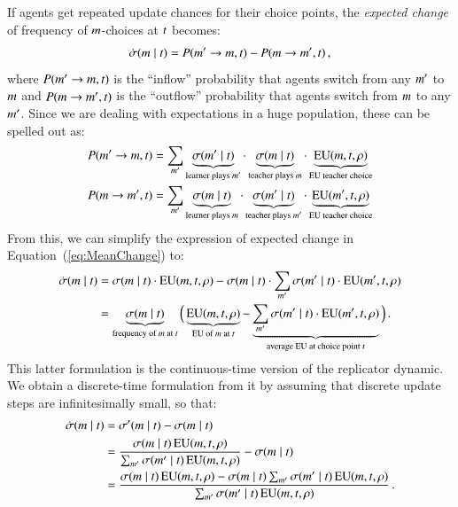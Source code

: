 \documentclass[fleqn,reqno,10pt]{article}
\begin{document}
If agents get repeated update chances for their choice points, the \emph{expected change} of
frequency of $m$-choices at $t$ becomes:
\begin{align}
  \label{eq:MeanChange}
  \dot{\sigma}(m \mid t) = P(m' \rightarrow m, t) - P(m \rightarrow m', t)\,,
\end{align}
where $P(m' \rightarrow m, t)$ is the ``inflow'' probability that agents switch from
any $m'$ to $m$ and $P(m \rightarrow m', t)$ is the ``outflow'' probability
that agents switch from $m$ to any $m'$. Since we are dealing with expectations in a
huge population, these can be spelled out as:
\begin{align*}
  P(m' \rightarrow m, t) & = \sum_{m'} \underbrace{\sigma(m' \mid
    t)}_{\text{learner plays $m'$}} \cdot
  \underbrace{\sigma(m \mid t)}_{\text{teacher plays $m$}} \cdot
  \underbrace{\mathrm{EU}(m, t, \rho)}_{\text{EU teacher choice}} \\
  P(m \rightarrow m', t) & = \sum_{m'} \underbrace{\sigma(m \mid
    t)}_{\text{learner plays $m$}} \cdot
  \underbrace{\sigma(m' \mid t)}_{\text{teacher plays $m'$}} \cdot
  \underbrace{\mathrm{EU}(m', t, \rho)}_{\text{EU teacher choice}}
\end{align*}
From this, we can simplify the expression of expected change in Equation~(\ref{eq:MeanChange})
to:
\begin{align*}
  \dot{\sigma}(m \mid t) & = \sigma(m \mid t) \cdot \mathrm{EU}(m,
  t, \rho) - \sigma(m \mid t) \cdot  \sum_{m'}
      \sigma(m' \mid t) \cdot \mathrm{EU}(m',t,\rho) \\
& = \underbrace{\sigma(m \mid
    t)}_{\text{frequency of $m$ at $t$}}  \Big ( \underbrace{\mathrm{EU}(m,
  t, \rho)}_{\text{EU of $m$ at $t$}} -   \underbrace{\sum_{m'}
      \sigma(m' \mid t) \cdot \mathrm{EU}(m',t,\rho)}_{\text{average
      EU at choice point $t$}} \Big )\,.
\end{align*}
This latter formulation is the continuous-time version of the replicator dynamic. We obtain a
discrete-time formulation from it by assuming that discrete update steps are infinitesimally
small, so that:
 \begin{align*}
    \dot{\sigma}(m \mid t) & = \sigma'(m \mid t) - \sigma(m
    \mid t)\\ 
    & = \frac{\sigma(m \mid
    t)  \thinspace \mathrm{EU}(m,t,\rho)}{\sum_{m'}\sigma(m' \mid
    t)  \thinspace \mathrm{EU}(m,t,\rho)} - \sigma(m
      \mid t) \\
    & = \frac{\sigma(m \mid
    t)  \thinspace \mathrm{EU}(m,t,\rho) - \sigma(m \mid t) \sum_{m'}\sigma(m' \mid
    t)  \thinspace \mathrm{EU}(m,t,\rho) }{\sum_{m'}\sigma(m' \mid
    t)  \thinspace \mathrm{EU}(m,t,\rho)}
      \,.
  \end{align*}
\end{document}

